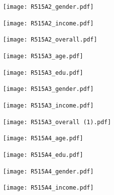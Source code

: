 \documentclass{article}
\begin{document}
\begin{figure}[H]
\centering
\caption{}
\texttt{[image: R515A2\_gender.pdf]}
\label{fig:my_label}
\end{figure}

\begin{figure}[H]
\centering
\caption{}
\texttt{[image: R515A2\_income.pdf]}
\label{fig:my_label}
\end{figure}

\begin{figure}[H]
\centering
\caption{}
\texttt{[image: R515A2\_overall.pdf]}
\label{fig:my_label}
\end{figure}

\begin{figure}[H]
\centering
\caption{}
\texttt{[image: R515A3\_age.pdf]}
\label{fig:my_label}
\end{figure}

\begin{figure}[H]
\centering
\caption{}
\texttt{[image: R515A3\_edu.pdf]}
\label{fig:my_label}
\end{figure}

\begin{figure}[H]
\centering
\caption{}
\texttt{[image: R515A3\_gender.pdf]}
\label{fig:my_label}
\end{figure}

\begin{figure}[H]
\centering
\caption{}
\texttt{[image: R515A3\_income.pdf]}
\label{fig:my_label}
\end{figure}

\begin{figure}[H]
\centering
\caption{}
\texttt{[image: R515A3\_overall (1).pdf]}
\label{fig:my_label}
\end{figure}

\begin{figure}[H]
\centering
\caption{}
\texttt{[image: R515A4\_age.pdf]}
\label{fig:my_label}
\end{figure}

\begin{figure}[H]
\centering
\caption{}
\texttt{[image: R515A4\_edu.pdf]}
\label{fig:my_label}
\end{figure}

\begin{figure}[H]
\centering
\caption{}
\texttt{[image: R515A4\_gender.pdf]}
\label{fig:my_label}
\end{figure}

\begin{figure}[H]
\centering
\caption{}
\texttt{[image: R515A4\_income.pdf]}
\label{fig:my_label}
\end{figure}
\end{document}
